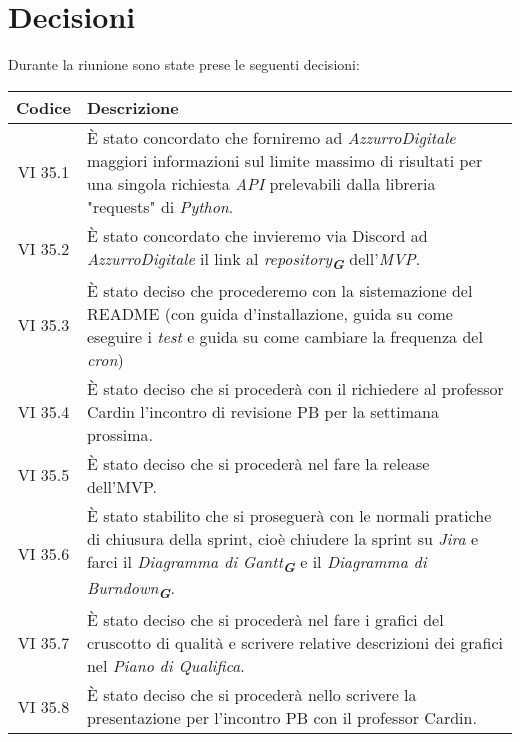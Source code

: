
\section{Decisioni}

Durante la riunione sono state prese le seguenti decisioni:

\vspace{0.5cm}

\begin{table}[htbp]
    \centering
    \begin{tabular}{|c|p{}|}
        \hline
        \rowcolor[gray]{0.75}
        \textbf{Codice} & \textbf{Descrizione}\\
        \hline
        VI 35.1 & È stato concordato che forniremo ad \emph{AzzurroDigitale} maggiori informazioni sul limite massimo di risultati per una singola richiesta \emph{API} prelevabili dalla libreria "requests" di \emph{Python}.\\
        \hline
        VI 35.2 & È stato concordato che invieremo via Discord ad \emph{AzzurroDigitale} il link al \emph{repository}\textsubscript{\textit{\textbf{G}}} dell'\emph{MVP}.\\
        \hline
        VI 35.3 & È stato deciso che procederemo con la sistemazione del README (con guida d'installazione, guida su come eseguire i \emph{test} e guida su come cambiare la frequenza del \emph{cron})\\
        \hline 
        VI 35.4 & È stato deciso che si procederà con il richiedere al professor Cardin l'incontro di revisione PB per la settimana prossima.\\
        \hline
        VI 35.5 & È stato deciso che si procederà nel fare la release dell'MVP.\\
        \hline
        VI 35.6 & È stato stabilito che si proseguerà con le normali pratiche di chiusura della sprint, cioè chiudere la sprint su \emph{Jira} e farci il \emph{Diagramma di Gantt}\textsubscript{\textit{\textbf{G}}} e il \emph{Diagramma di Burndown}\textsubscript{\textit{\textbf{G}}}.\\
        \hline
        VI 35.7 & È stato deciso che si procederà nel fare i grafici del cruscotto di qualità e scrivere relative descrizioni dei grafici nel \emph{Piano di Qualifica}.\\
        \hline
        VI 35.8 & È stato deciso che si procederà nello scrivere la presentazione per l'incontro PB con il professor Cardin.\\

\end{tabular}
\end{table}
